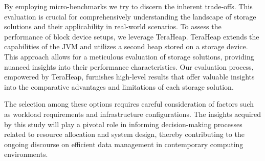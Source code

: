 By employing micro-benchmarks we try to discern the inherent trade-offs. This
evaluation is crucial for comprehensively understanding the landscape of storage
solutions and their applicability in real-world scenarios. To assess the
performance of block device setups, we leverage TeraHeap. TeraHeap extends the
capabilities of the JVM and utilizes a second heap stored on a storage device.
This approach allows for a meticulous evaluation of storage solutions, providing
nuanced insights into their performance characteristics. Our evaluation process,
empowered by TeraHeap, furnishes high-level results that offer valuable insights
into the comparative advantages and limitations of each storage solution.

The selection among these options requires careful consideration of factors such
as workload requirements and infrastructure configurations. The insights
acquired by this study will play a pivotal role in informing decision-making
processes related to resource allocation and system design, thereby contributing
to the ongoing discourse on efficient data management in contemporary computing
environments.

